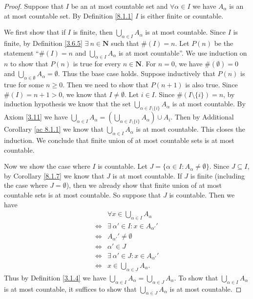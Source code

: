 \begin{proof}
    Suppose that \(I\) be an at most countable set and \(\forall \alpha \in I\) we have \(A_{\alpha}\) is an at most countable set.
    By Definition \ref{8.1.1} \(I\) is either finite or countable.

    We first show that if \(I\) is finite, then \(\bigcup_{\alpha \in I} A_{\alpha}\) is at most countable.
    Since \(I\) is finite, by Definition \ref{3.6.5} \(\exists\ n \in \mathbf{N}\) such that \(\#(I) = n\).
    Let \(P(n)\) be the statement ``\(\#(I) = n\) and \(\bigcup_{\alpha \in I} A_{\alpha}\) is at most countable''.
    We use induction on \(n\) to show that \(P(n)\) is true for every \(n \in \mathbf{N}\).
    For \(n = 0\), we have \(\#(\emptyset) = 0\) and \(\bigcup_{\alpha \in \emptyset} A_{\alpha} = \emptyset\).
    Thus the base case holds.
    Suppose inductively that \(P(n)\) is true for some \(n \geq 0\).
    Then we need to show that \(P(n + 1)\) is also true.
    Since \(\#(I) = n + 1 > 0\), we know that \(I \neq \emptyset\).
    Let \(i \in I\).
    Since \(\#(I \setminus \{i\}) = n\), by induction hypothesis we know that the set \(\bigcup_{\alpha \in I \setminus \{i\}} A_{\alpha}\) is at most countable.
    By Axiom \ref{3.11} we have \(\bigcup_{\alpha \in I} A_{\alpha} = (\bigcup_{\alpha \in I \setminus \{i\}} A_{\alpha}) \cup A_i\).
    Then by Additional Corollary \ref{ac 8.1.1} we know that \(\bigcup_{\alpha \in I} A_{\alpha}\) is at most countable.
    This closes the induction.
    We conclude that finite union of at most countable sets is at most countable.

    Now we show the case where \(I\) is countable.
    Let \(J = \{\alpha \in I : A_{\alpha} \neq \emptyset\}\).
    Since \(J \subseteq I\), by Corollary \ref{8.1.7} we know that \(J\) is at most countable.
    If \(J\) is finite (including the case where \(J = \emptyset\)), then we already show that finite union of at most countable sets is at most countable.
    So suppose that \(J\) is countable.
    Then we have
    \begin{align*}
             & \forall x \in \bigcup_{\alpha \in I} A_{\alpha} \\
        \iff & \exists\ \alpha' \in I : x \in A_{\alpha'}'     \\
        \iff & A_{\alpha'}' \neq \emptyset                     \\
        \iff & \alpha' \in J                                   \\
        \iff & \exists\ \alpha' \in J : x \in A_{\alpha'}'     \\
        \iff & x \in \bigcup_{\alpha \in J} A_{\alpha}.
    \end{align*}
    Thus by Definition \ref{3.1.4} we have \(\bigcup_{\alpha \in I} A_{\alpha} = \bigcup_{\alpha \in J} A_{\alpha}\).
    To show that \(\bigcup_{\alpha \in I} A_{\alpha}\) is at most countable, it suffices to show that \(\bigcup_{\alpha \in J} A_{\alpha}\) is at most countable.


\end{proof}
